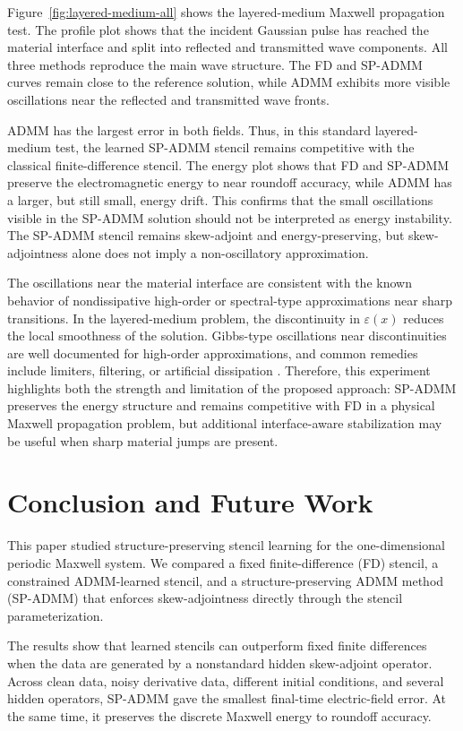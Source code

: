 \documentclass[11pt]{article}
\numberwithin{equation}{section}
\numberwithin{figure}{section}
\numberwithin{table}{section}
\begin{document}
Figure~\ref{fig:layered-medium-all} shows the layered-medium Maxwell
propagation test. The profile plot shows that the incident Gaussian pulse has
reached the material interface and split into reflected and transmitted wave
components. All three methods reproduce the main wave structure. The FD and
SP-ADMM curves remain close to the reference solution, while ADMM exhibits
more visible oscillations near the reflected and transmitted wave fronts.
 
ADMM has the largest error in both fields. Thus, in this
standard layered-medium test, the learned SP-ADMM stencil remains competitive
with the classical finite-difference stencil.
The energy plot shows that FD and SP-ADMM preserve the
electromagnetic energy to near roundoff accuracy, while ADMM has a larger,
but still small, energy drift. This confirms that the small oscillations
visible in the SP-ADMM solution should not be interpreted as energy
instability. The SP-ADMM stencil remains skew-adjoint and energy-preserving,
but skew-adjointness alone does not imply a non-oscillatory approximation.

The oscillations near the material interface are consistent with the known
behavior of nondissipative high-order or spectral-type approximations near
sharp transitions. In the layered-medium problem, the discontinuity in
$\varepsilon(x)$ reduces the local smoothness of the solution. Gibbs-type
oscillations near discontinuities are well documented for high-order
approximations, and common remedies include limiters, filtering, or artificial
dissipation \cite{gottlieb1997gibbs,leveque2007finite,discacciati2020viscosity}.
Therefore, this experiment highlights both the strength and limitation of the
proposed approach: SP-ADMM preserves the energy structure and remains
competitive with FD in a physical Maxwell propagation problem, but additional
interface-aware stabilization may be useful when sharp material jumps are
present.
\section{Conclusion and Future Work}
\label{sec:conclusion}

This paper studied structure-preserving stencil learning for the
one-dimensional periodic Maxwell system. We compared a fixed finite-difference
(FD) stencil, a constrained ADMM-learned stencil, and a structure-preserving
ADMM method (SP-ADMM) that enforces skew-adjointness directly through the
stencil parameterization.

The results show that learned stencils can outperform fixed finite
differences when the data are generated by a nonstandard hidden
skew-adjoint operator. Across clean data, noisy derivative data, different
initial conditions, and several hidden operators, SP-ADMM gave the
smallest final-time electric-field error. At the same time, it preserves the
discrete Maxwell energy to roundoff accuracy.
\end{document}
